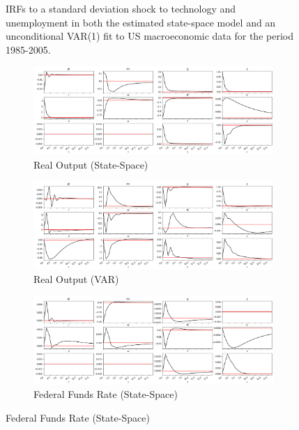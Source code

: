 \documentclass{article}
\begin{document}
\begin{figure}[!ht]
  \caption{IRFs to a standard deviation shock to technology and unemployment in both the estimated state-space model and an unconditional VAR(1) fit to US macroeconomic data for the period 1985-2005.}
  \label{us_zu_irfs}
\end{figure}

\begin{figure}
  \centering
  \begin{subfigure}{0.8\textwidth}
    \includegraphics[width=\linewidth]{images/real_data_y_irf.png}
    \caption{Real Output (State-Space)}
    \label{us_y_irf}
  \end{subfigure}
  \begin{subfigure}{0.8\textwidth}
    \includegraphics[width=\linewidth]{images/real_data_y_var_irf.png}
    \caption{Real Output (VAR)}
    \label{us_y_var_irf}
  \end{subfigure}
  \begin{subfigure}{0.8\textwidth}
    \includegraphics[width=\linewidth]{images/real_data_rm_irf.png}
    \caption{Federal Funds Rate (State-Space)}
    \label{us_rm_irf}

\end{subfigure}
\end{figure}
\end{document}
